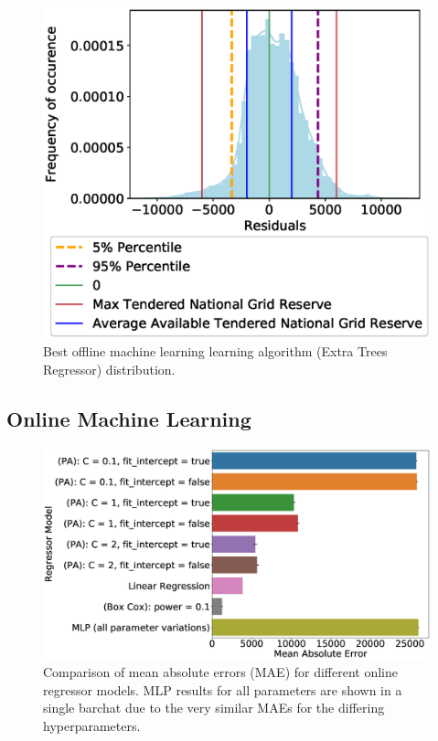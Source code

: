 \documentclass[final,3p,times,twocolumn,numbers]{elsarticle}
\begin{document}
\begin{figure}
\centering
\includegraphics[width=\columnwidth,natwidth=500,natheight=500]{figures/results/ExtraTreesRegressor_distribution_plot.eps}
\caption{Best offline machine learning learning algorithm (Extra Trees Regressor) distribution.}
\label{fig:best_offline_learning_day_distribution}
\end{figure}


\subsection{Online Machine Learning}

\begin{figure}[!htbp]
\includegraphics[width=\columnwidth,natwidth=1300,natheight=1300]{figures/results/online_model_mae_barplot.eps}
\caption{Comparison of mean absolute errors (MAE) for different online regressor models. MLP results for all parameters are shown in a single barchat due to the very similar MAEs for the differing hyperparameters.}
\label{fig:online_model_mae_barplot}
\end{figure}
\end{document}
